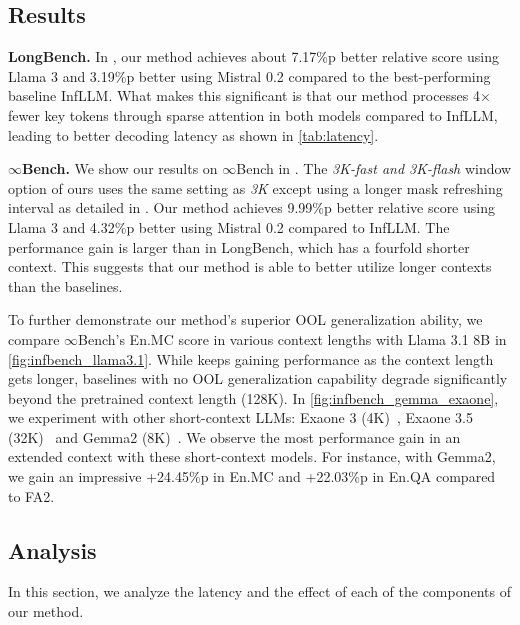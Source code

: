 
\subsection{Results}
\textbf{LongBench.}
In , our method achieves about 7.17\%p better relative score using Llama 3 and 3.19\%p better using Mistral 0.2 compared to the best-performing baseline InfLLM.
What makes this significant is that our method processes 4$\times$ fewer key tokens through sparse attention in both models compared to InfLLM, leading to better decoding latency as shown in \cref{tab:latency}.

\textbf{$\infty$Bench.}
We show our results on $\infty$Bench in . The \textit{3K-fast and 3K-flash} window option of ours uses the same setting as \textit{3K} except using a longer mask refreshing interval as detailed in .
Our method achieves 9.99\%p better relative score using Llama 3 and 4.32\%p better using Mistral 0.2 compared to InfLLM. The performance gain is larger than in LongBench, which has a fourfold shorter context. This suggests that our method is able to better utilize longer contexts than the baselines.

To further demonstrate our method's superior OOL generalization ability, we compare $\infty$Bench's En.MC score in various context lengths with Llama 3.1 8B in \cref{fig:infbench_llama3.1}.
While \ours keeps gaining performance as the context length gets longer, baselines with no OOL generalization capability degrade significantly beyond the pretrained context length (128K).
In \cref{fig:infbench_gemma_exaone}, we experiment with other short-context LLMs: Exaone 3 (4K)~\citep{research_exaone3_2024}, Exaone 3.5 (32K)~\citep{research_exaone_2024} and Gemma2 (8K)~\citep{team_gemma_2024}.
We observe the most performance gain in an extended context with these short-context models. For instance, with Gemma2, we gain an impressive +24.45\%p in En.MC and +22.03\%p in En.QA compared to FA2.

\subsection{Analysis}
In this section, we analyze the latency and the effect of each of the components of our method.


